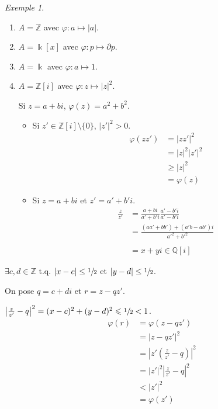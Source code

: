 \documentclass{report}
\theoremstyle{definition}
\theoremstyle{remark}
\newtheorem*{exem}{Exemple}
\def\lte{\leqslant}
\def\gte{\geqslant}
\def\ZZ{\mathbb{Z}}
\def\QQ{\mathbb{Q}}
\newcommand*{\abs}[1]{\left|#1\right|}
\begin{document}
	\begin{exem}
		\begin{enumerate}
			\item $A=\ZZ$ avec $\varphi:a\mapsto\abs{a}$.
			\item $A=\Bbbk[x]$ avec $\varphi:p\mapsto\partial p$.
			\item $A=\Bbbk$ avec $\varphi:a\mapsto1$.
			\item $A=\ZZ[i]$ avec $\varphi:z\mapsto\abs{z}^2$.

			Si $z=a+bi$, $\varphi(z)=a^2+b^2$.
			\begin{itemize}
				\item Si $z'\in\ZZ[i]\setminus\{0\}$, $\abs{z'}^2>0$.
				\begin{align*}
					\varphi(zz')&= \abs{zz'}^2\\
					&= \abs{z}^2 \abs{z'}^2\\
					&\gte \abs{z}^2\\
					&= \varphi(z)
				\end{align*}
				\item Si $z=a+bi$ et $z'=a'+b'i$.
				\begin{align*}
					\frac{z}{z'}&= \frac{a+bi}{a'+b'i} \frac{a'-b'i}{a'-b'i}\\
					&= \frac{(aa'+bb')+(a'b-ab')i}{a'^2+b'^2}\\\\
					&= x+yi\in\QQ[i]
				\end{align*}
			\end{itemize}
		\end{enumerate}

		$\exists c,d\in\ZZ$ t.q. $\abs{x-c}\leq\sfrac{1}{2}$ et $\abs{y-d}\leq\sfrac{1}{2}$.

		On pose $q=c+di$ et $r=z-qz'$.

		$\abs{\frac{z}{z'}-q}^2 = (x-c)^2+(y-d)^2 \lte \sfrac{1}{2} < 1$.
		\begin{align*}
			\varphi(r)&= \varphi(z-qz')\\
			&= \abs{z-qz'}^2\\
			&= \abs{z'\left(\frac{z}{z'}-q\right)}^2\\
			&= \abs{z'}^2 \abs{\frac{z}{z'}-q}^2\\
			&< \abs{z'}^2\\
			&= \varphi(z')
		\end{align*}
	\end{exem}
\end{document}
